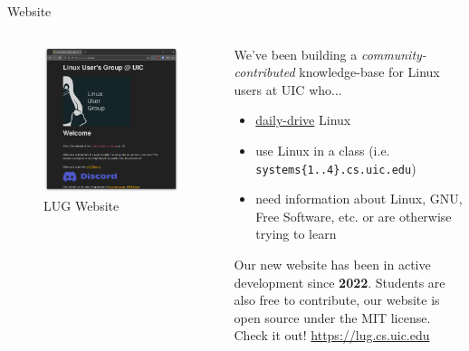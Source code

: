 \documentclass{beamer}
\begin{document}
\begin{frame}{Website}
	\begin{columns}
		\begin{column}{0.4\textwidth}
			\begin{figure}
				\centering
				\includegraphics[width=\textwidth]{website.png}
				\caption{LUG Website}
			\end{figure}
		\end{column}
		\begin{column}{0.6\textwidth}
			We've been building a \textit{community-contributed}
			knowledge-base for Linux users at UIC who...
			\pause
			\begin{itemize}
				\item \underline{daily-drive} Linux
				\pause
				\item use Linux in a class (i.e.
					\texttt{systems\{1..4\}.cs.uic.edu})
					\pause
				\item need information about Linux, GNU, Free
					Software, etc. or are otherwise trying
					to learn
					\pause
			\end{itemize}
			Our new website has been in active development since
			\textbf{2022}. Students are also free to contribute,
			our website is open source under the MIT license. Check
			it out! \url{https://lug.cs.uic.edu}
		\end{column}
	\end{columns}
\end{frame}
\end{document}
